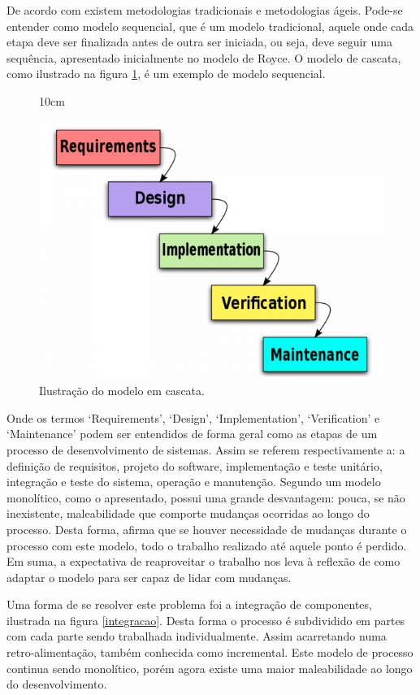 De acordo com  existem metodologias tradicionais e metodologias ágeis. Pode-se entender como modelo sequencial, que é um modelo tradicional,  aquele onde cada etapa deve ser finalizada antes de outra ser iniciada, ou seja, deve seguir uma sequência, apresentado inicialmente no modelo de Royce. O modelo de cascata, como ilustrado na figura \ref{waterfall}, é um exemplo de modelo sequencial.

\begin{figure}[!ht]{10cm}
  \caption{Ilustração do modelo em cascata.} \label{waterfall}
  \includegraphics[width=0.6\hsize]{figuras/Waterfall-Model-560x420.png}
\end{figure}

Onde os termos `Requirements', `Design', `Implementation', `Verification' e `Maintenance' podem ser entendidos de forma geral como as etapas de um processo de desenvolvimento de sistemas. Assim se referem respectivamente a: a definição de requisitos, projeto do software, implementação e teste unitário, integração e teste do sistema, operação e manutenção. 
Segundo  um modelo monolítico, como o apresentado, possui uma grande desvantagem: pouca, se não inexistente, maleabilidade que comporte mudanças ocorridas ao longo do processo. Desta forma,  afirma que se houver necessidade de mudanças durante o processo com este modelo, todo o trabalho realizado até aquele ponto é perdido. Em suma, a expectativa de reaproveitar o trabalho nos leva à reflexão de como adaptar o modelo para ser capaz de lidar com mudanças.

Uma forma de se resolver este problema foi a integração de componentes, ilustrada na figura \ref{integracao}. Desta forma o processo é subdividido em partes com cada parte sendo trabalhada individualmente. Assim acarretando numa retro-alimentação, também conhecida como incremental. Este modelo de processo continua sendo monolítico, porém agora existe uma maior maleabilidade ao longo do desenvolvimento.

